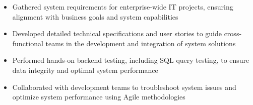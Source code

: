 \par\bigskip
{}
\par\smallskip
\begin{minipage}{13.75cm}
  \begin{minipage}{6.5cm}
    \begin{itemize}
      \item Gathered system requirements for enterprise-wide IT projects, ensuring alignment with business goals and system capabilities
      \item Developed detailed technical specifications and user stories to guide cross-functional teams in the development and integration of system solutions
    \end{itemize}
  \end{minipage}
  \hfill
  \begin{minipage}{6.5cm}
    \begin{itemize}
      \item Performed hands-on backend testing, including SQL query testing, to ensure data integrity and optimal system performance
      \item Collaborated with development teams to troubleshoot system issues and optimize system performance using Agile methodologies
    \end{itemize}
  \end{minipage}
\end{minipage}
\par\smallskip
\divider

